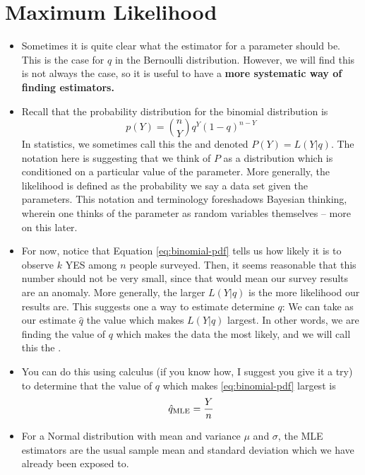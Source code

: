 
\section{Maximum Likelihood}
\begin{itemize}
\item
Sometimes it is quite clear what the estimator for a parameter should be. This is the case for $q$ in the Bernoulli distribution. However, we will find this is not always the case, so it is useful to have a {\bf more systematic way of finding estimators.} 
\item Recall that the probability distribution for the binomial distribution is 
\begin{equation}\label{eq:binomial-pdf}
p(Y) = {n \choose Y}q^Y(1-q)^{n-Y}
\end{equation}
In statistics, we sometimes call this the  and denoted $P(Y) = L(Y|q)$. The notation here is suggesting that we think of $P$ as a distribution which is conditioned on a particular value of the parameter.  More generally, the likelihood is defined as the probability we say a data set given the parameters. This notation and terminology foreshadows Bayesian thinking, wherein one thinks of the parameter as random variables themselves -- more on this later. 
\item For now, notice that Equation \eqref{eq:binomial-pdf} tells us how likely it is to observe $k$ YES among $n$ people surveyed. Then, it seems reasonable that this number should not be very small, since that would mean our survey results are an anomaly. More generally, the larger $L(Y|q)$ is the more likelihood our results are. This suggests one a way to estimate determine $q$: We can take as our estimate $\hat{q}$ the value which makes $L(Y|q)$ largest. In other words, we are finding the value of $q$ which makes the data the most likely, and we will call this the .
\item You can do this using calculus (if you know how, I suggest you give it a try) to determine that the value of $q$ which makes \eqref{eq:binomial-pdf} largest is \begin{equation*}
\hat{q}_{\rm MLE} = \frac{Y}{n}
\end{equation*}
\item For a Normal distribution with mean and variance $\mu$ and $\sigma$, the MLE estimators are the usual sample mean and standard deviation which we have already been exposed to. 
\end{itemize}
